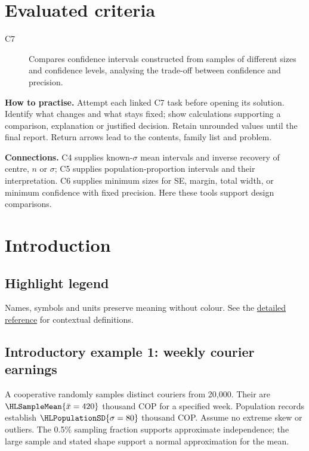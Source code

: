 \maketitle
\setcounter{tocdepth}{1}\setcounter{secnumdepth}{3}
\label{toc}\tableofcontents
\section*{Evaluated criteria}
\begin{description}
\item[C7] Compares confidence intervals constructed from samples of different sizes and confidence levels, analysing the trade-off between confidence and precision.
\end{description}
\textbf{How to practise.} Attempt each linked C7 task before opening its solution. Identify what changes and what stays fixed; show calculations supporting a comparison, explanation or justified decision. Retain unrounded values until the final report. Return arrows lead to the contents, family list and problem.

\textbf{Connections.} C4 supplies known-$\sigma$ mean intervals and inverse recovery of centre, $n$ or $\sigma$; C5 supplies population-proportion intervals and their interpretation. C6 supplies minimum sizes for SE, margin, total width, or minimum confidence with fixed precision. Here these tools support design comparisons.
\clearpage
\section{Introduction}\label{sec:introduction}
\subsection*{Highlight legend}\label{tab:highlight-legend}
Names, symbols and units preserve meaning without colour. See the \hyperref[tab:notation-reference]{detailed reference} for contextual definitions.
\subsection{Introductory example 1: weekly courier earnings}\label{ex:intro-one}
A cooperative randomly samples  distinct couriers from 20,000. Their  are $\HLSampleMean{\bar x=420}$ thousand COP for a specified week. Population records establish $\HLPopulationSD{\sigma=80}$ thousand COP. Assume no extreme skew or outliers. The 0.5\% sampling fraction supports approximate independence; the large sample and stated shape support a normal approximation for the mean.

